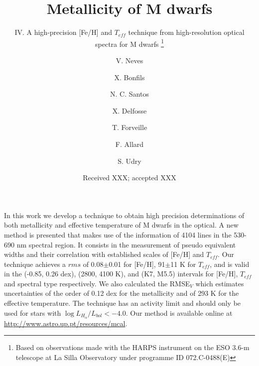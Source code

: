 \documentclass{aa}
\begin{document}
 


   \title{Metallicity of M dwarfs }

  \subtitle{IV. A high-precision [Fe/H] and $T_{eff}$ technique from high-resolution optical spectra for M dwarfs \thanks{Based on observations made with the HARPS instrument on the ESO 3.6-m telescope at La Silla Observatory under programme ID 072.C-0488(E)}}

\author{ V. Neves \and X. Bonfils \and
  N. C. Santos \and X. Delfosse \and
  T. Forveille  \and F. Allard  \and
  S. Udry}

   \date{Received XXX; accepted XXX}

 
  \abstract
{}
   {In this work we develop a technique to obtain high precision determinations of both metallicity and effective temperature of M dwarfs in the optical.}
   {A new method is presented that makes use of the information of 4104 lines in the 530-690 nm spectral region. It consists in the measurement of pseudo equivalent widths and their correlation with established scales of [Fe/H] and $T_{eff}$.}
   {Our technique achieves a $rms$ of 0.08$\pm$0.01 for [Fe/H], 91$\pm$11 K for $T_{eff}$, and is valid in the (-0.85, 0.26 dex), (2800, 4100 K), and (K7, M5.5) intervals for [Fe/H], $T_{eff}$ and spectral type respectively. We also calculated the RMSE$_{V}$ which estimates uncertainties of the order of 0.12 dex for the metallicity and of 293 K for the effective temperature. The technique has an activity limit and should only be used for stars with  $\log{L_{H_{\alpha}}/L_{bol}} < -4.0$. Our method is available online at \url{http://www.astro.up.pt/resources/mcal}.  }
   {}
\end{document}

